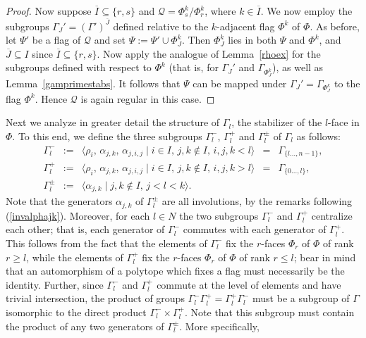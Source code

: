 \documentclass[12pt]{article}
\renewcommand{\bar}{\overline}
\renewcommand{\>}{\rangle}
\renewcommand{\leq}{\leqslant}
\renewcommand{\geq}{\geqslant}
\theoremstyle{definition}\newtheorem{definition}{Definition}[section]
\begin{document}
\begin{proof}
Now suppose $\bar{I}\subseteq\{r,s\}$ and $\mathcal{Q}=\Phi_s^k/\Phi_r^k$, where  $k\in\bar{I}$. We now employ the subgroups $\Gamma_{J}'=(\Gamma')^{\bar{J}}$ defined relative to the $k$-adjacent flag $\Phi^k$ of $\Phi$. As before, let $\Psi'$ be a flag of $\mathcal{Q}$ and set $\Psi:=\Psi'\cup\Phi_J^k$. Then $\Phi_J^k$ lies in both $\Psi$ and $\Phi^k$, and $\bar{J}\subseteq I$ since $\bar{I}\subseteq\{r,s\}$. Now apply the analogue of Lemma~\ref{rhoex} for the subgroups defined with respect to $\Phi^k$ (that is, for $\Gamma_{J}'$ and $\Gamma_{\Phi^k_J}$), as well as Lemma~\ref{gamprimestabs}. It follows that $\Psi$ can be mapped under $\Gamma_{J}'=\Gamma_{\Phi^k_J}$ to the flag $\Phi^k$. Hence $\mathcal{Q}$ is again regular in this case.
\end{proof}

Next we analyze in greater detail the structure of $\Gamma_l$, the stabilizer of the $l$-face in $\Phi$. To this end, we define the three subgroups $\Gamma_l^-$, $\Gamma_l^+$ and $\Gamma_l^{\pm}$ of $\Gamma_l$ as follows:
\begin{equation}
\label{Gamma-}
\begin{array}{lllll}
\Gamma_l^{-} &\!\!\!:=\!\!\!& \langle \rho_i,\, \alpha_{j,k},\, \alpha_{j,i,j}  \mid i \in I, \, j,k \notin I, \,  i, j, k <l \rangle 
&\!\!\!=\!\!\!& \Gamma_{\{l \dots, n-1\}},  \\[0.08in]
\Gamma_l^+ &\!\!\!:=\!\!\!& \langle \rho_i,\, \alpha_{j,k}, \,\alpha_{j,i,j}  \mid i \in I,\, j,k \notin I, \,  i, j, k > l \rangle
&\!\!\!=\!\!\!& \Gamma_{\{0 \dots, l\}}, \\[0.08in]
\Gamma_l^{\pm} &\!\!\!:=\!\!\!& \langle\alpha_{j,k}\mid j,k \notin I, \,  j<l<k \rangle. 
\end{array}
\end{equation}
Note that the generators $\alpha_{j,k}$ of $\Gamma_l^{\pm}$ are all involutions, by the remarks following (\ref{invalphajk}). Moreover, for each $l\in N$ the two subgroups $\Gamma_l^{-}$ and $\Gamma_l^+$ centralize each other; that is, each generator of $\Gamma_l^{-}$ commutes with each generator of $\Gamma_l^+$. This follows from the fact that the elements of $\Gamma_l^-$ fix the $r$-faces $\Phi_r$ of $\Phi$ of rank $r\geq l$, while the elements of $\Gamma_l^+$ fix the $r$-faces $\Phi_r$ of $\Phi$ of rank $r\leq l$; bear in mind that an automorphism of a polytope which fixes a flag must necessarily be the identity. Further, since $\Gamma_l^-$ and $\Gamma_l^+$ commute at the level of elements and have trivial intersection, the product of groups $\Gamma_l^{-}\Gamma_l^{+} = \Gamma_l^{+} \Gamma_l^{-}$ must be a subgroup of $\Gamma$ isomorphic to the direct product $\Gamma_l^{-}\times\Gamma_l^{+}$. Note that this subgroup must contain the product of any two generators of $\Gamma_l^{\pm}$. More specifically, 
\end{document}
